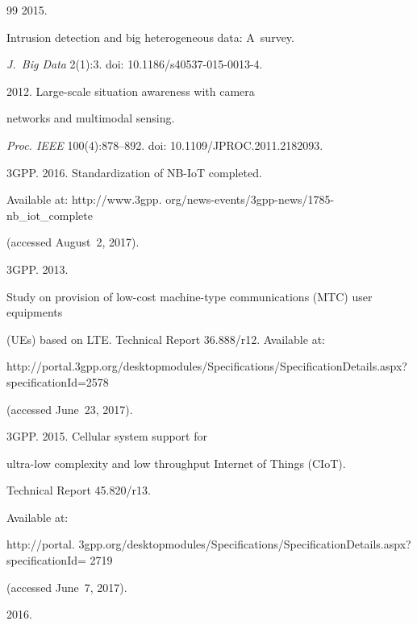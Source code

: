 {{\begin{thebibliography}{99}
 2015. 


Intrusion detection and big heterogeneous data: A~survey. 


\textit{J.~Big Data} 2(1):3. doi: 10.1186\!/\!s40537-015-0013-4.




 2012. Large-scale situation awareness with camera 


networks and multimodal sensing. 


\textit{Proc.  IEEE} 100(4):878--892. doi: 10.1109\!/\!JPROC.2011.2182093.




3GPP. 2016. Standardization of NB-IoT completed.  


Available  at: {\sf http://www.3gpp. org/news-events/3gpp-news/1785-nb\_iot\_complete} 


(accessed August~2, 2017).







3GPP.  2013. 


Study on provision of low-cost machine-type communications (MTC) user equipments


 (UEs) based on LTE. Technical Report  36.888\!/\!r12. Available  at: 


 {\sf http://portal.3gpp.org/desktopmodules/Specifications/SpecificationDetails.aspx? specificationId=2578}


  (accessed June~23, 2017).




3GPP.  2015. Cellular system support for 


ultra-low complexity and low throughput Internet of Things (CIoT). 


Technical Report 45.820\!/\!r13.


Available at: {\sf 


http://portal. 3gpp.org/desktopmodules/Specifications/SpecificationDetails.aspx?specificationId= 2719}


(accessed June~7, 2017).







 2016. 



\end{thebibliography}}}
